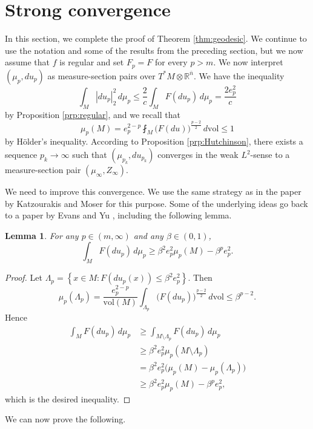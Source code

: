 \documentclass[10pt,a4paper]{amsart}
\newcommand{\R}{\mathbb{R}}
\newcommand{\vol}{\mathrm{vol}}
\newcommand{\ndim}{{\bar{n}}}
\newcommand{\set}[2]{\left\{ #1 \colon #2 \right\}}
\newtheorem{lemma}[theorem]{Lemma}
\begin{document}
\section{Strong convergence} \label{sct:strong-convergence}

In this section, we complete the proof of Theorem \ref{thm:geodesic}.
We continue to use the notation and some of the results from the preceding section, but we now assume that $f$ is regular and set
$F_p = F$ for every $p > m$. We now interpret $(\mu_p, du_p)$ as
measure-section pairs over $T^*M \otimes \R^\ndim$. We have the inequality
\[
\int_M |du_p|_2^2 \, d\mu_p \le \frac{2}{c} \int_M F(du_p) \, d\mu_p = \frac{2e_p^2}{c}
\]
by Proposition \ref{prp:regular}, and we recall that
\[
\mu_p(M) = e_p^{2 - p} \fint_M \bigl(F(du)\bigr)^{\frac{p - 2}{2}} \, d\vol \le 1
\]
by H\"older's inequality. According to Proposition \ref{prp:Hutchinson},
there exists a sequence $p_k \to \infty$ such that $(\mu_{p_k}, du_{p_k})$ converges in the weak $L^2$-sense
to a measure-section pair $(\mu_\infty, Z_\infty)$.

We need to improve this convergence. We use the same strategy as in the paper by
Katzourakis and Moser \cite{Katzourakis-Moser:25} for this purpose. Some of the underlying ideas go back
to a paper by Evans and Yu \cite{Evans-Yu:05}, including the following lemma.

\begin{lemma} \label{lem:energy-estimate}
For any $p \in (m, \infty)$ and any $\beta \in (0, 1)$,
\[
\int_M F(du_p) \, d\mu_p \ge \beta^2 e_p^2 \mu_p(M) - \beta^p e_p^2.
\]
\end{lemma}

\begin{proof}
Let $\Lambda_p = \set{x \in M}{F(du_p(x)) \le \beta^2 e_p^2}$. Then
\[
\mu_p(\Lambda_p) = \frac{e_p^{2 - p}}{\vol(M)} \int_{\Lambda_p} \bigl(F(du_p)\bigr)^{\frac{p - 2}{2}} \, d\vol \le \beta^{p - 2}.
\]
Hence
\[
\begin{split}
\int_M F(du_p) \, d\mu_p & \ge \int_{M \setminus \Lambda_p} F(du_p) \, d\mu_p \\
& \ge \beta^2 e_p^2 \mu_p(M \setminus \Lambda_p) \\
& = \beta^2 e_p^2 \bigl(\mu_p(M) - \mu_p(\Lambda_p)\bigr) \\
& \ge \beta^2 e_p^2 \mu_p(M) - \beta^p e_p^2,
\end{split}
\]
which is the desired inequality.
\end{proof}

We can now prove the following.
\end{document}

